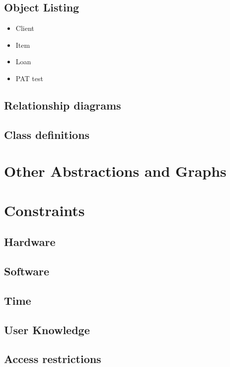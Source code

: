 \documentclass[a4paper,12pt]{report}
\begin{document}
\subsection{Object Listing}

\begin{itemize}
    \item Client
    \item Item
    \item Loan
    \item PAT test
\end{itemize}

\subsection{Relationship diagrams}

\subsection{Class definitions}

\section{Other Abstractions and Graphs}

\section{Constraints}

\subsection{Hardware}

\subsection{Software}

\subsection{Time}

\subsection{User Knowledge}

\subsection{Access restrictions}
\end{document}
